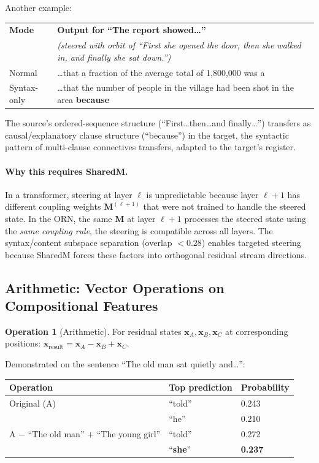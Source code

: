 \documentclass[11pt, a4paper]{article}
\newcommand{\M}{\mathbf{M}}
\newcommand{\x}{\mathbf{x}}
\theoremstyle{plain}
\theoremstyle{definition}
\newtheorem{operation}{Operation}
\theoremstyle{remark}
\begin{document}
Another example:

\begin{center}\small
\begin{tabular}{lp{9cm}}
\toprule
\textbf{Mode} & \textbf{Output for ``The report showed\ldots''} \\
& \emph{(steered with orbit of ``First she opened the door, then she walked in, and finally she sat down.'')} \\
\midrule
Normal & \ldots that a fraction of the average total of 1,800,000 was a \\
Syntax-only & \ldots that the number of people in the village had been shot in the area \textbf{because} \\
\bottomrule
\end{tabular}
\end{center}

The source's ordered-sequence structure (``First\ldots then\ldots and finally\ldots'') transfers as causal/explanatory clause structure (``because'') in the target, the syntactic pattern of multi-clause connectives transfers, adapted to the target's register.

\paragraph{Why this requires SharedM.}
In a transformer, steering at layer $\ell$ is unpredictable because layer $\ell+1$ has different coupling weights $\M^{(\ell+1)}$ that were not trained to handle the steered state.
In the ORN, the same $\M$ at layer $\ell+1$ processes the steered state using the \emph{same coupling rule}, the steering is compatible across all layers.
The syntax/content subspace separation (overlap $< 0.28$) enables targeted steering because SharedM forces these factors into orthogonal residual stream directions.

\subsection{Arithmetic: Vector Operations on Compositional Features}

\begin{operation}[Arithmetic]
For residual states $\x_A, \x_B, \x_C$ at corresponding positions: $\x_{\text{result}} = \x_A - \x_B + \x_C$.
\end{operation}

Demonstrated on the sentence ``The old man sat quietly and\ldots'':

\begin{center}\small
\begin{tabular}{lll}
\toprule
\textbf{Operation} & \textbf{Top prediction} & \textbf{Probability} \\
\midrule
Original (A) & ``told'' & 0.243 \\
& ``he'' & 0.210 \\
\midrule
A $-$ ``The old man'' $+$ ``The young girl'' & ``told'' & 0.272 \\
& ``\textbf{she}'' & \textbf{0.237} \\
\bottomrule
\end{tabular}
\end{center}
\end{document}
